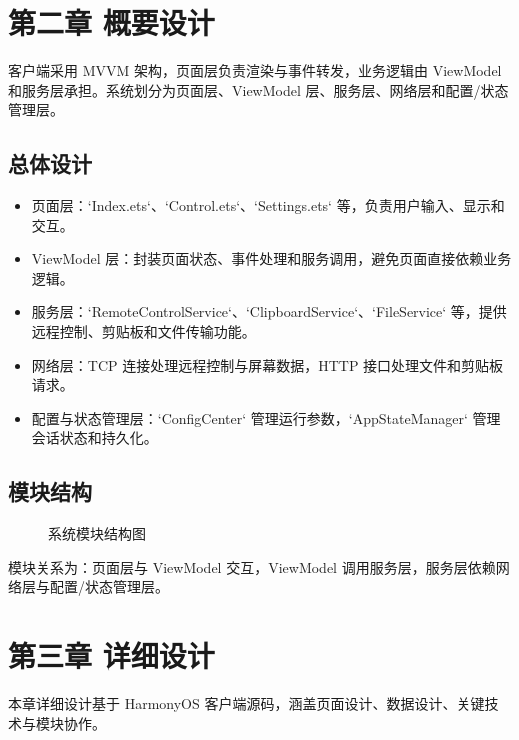 \documentclass[12pt,a4paper]{article}
\begin{document}
\section{第二章 概要设计}

客户端采用 MVVM 架构，页面层负责渲染与事件转发，业务逻辑由 ViewModel 和服务层承担。系统划分为页面层、ViewModel 层、服务层、网络层和配置/状态管理层。

\subsection{总体设计}

\begin{itemize}
    \item 页面层：`Index.ets`、`Control.ets`、`Settings.ets` 等，负责用户输入、显示和交互。
    \item ViewModel 层：封装页面状态、事件处理和服务调用，避免页面直接依赖业务逻辑。
    \item 服务层：`RemoteControlService`、`ClipboardService`、`FileService` 等，提供远程控制、剪贴板和文件传输功能。
    \item 网络层：TCP 连接处理远程控制与屏幕数据，HTTP 接口处理文件和剪贴板请求。
    \item 配置与状态管理层：`ConfigCenter` 管理运行参数，`AppStateManager` 管理会话状态和持久化。
\end{itemize}

\subsection{模块结构}

\begin{figure}[H]
    \centering
    \fbox{\parbox{12cm}{\vspace{3cm}
    [模块结构图位置] \\\[3cm]
    }}
    \caption{系统模块结构图}
\end{figure}

模块关系为：页面层与 ViewModel 交互，ViewModel 调用服务层，服务层依赖网络层与配置/状态管理层。

\section{第三章 详细设计}

本章详细设计基于 HarmonyOS 客户端源码，涵盖页面设计、数据设计、关键技术与模块协作。
\end{document}
